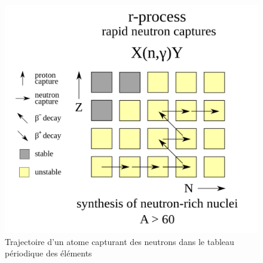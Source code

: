  \begin{figure}[H]
 	\centering
 	\includegraphics[scale=0.15]{images/processusr}
 	\caption{Trajectoire d'un atome capturant des neutrons dans le tableau périodique des éléments}
 \end{figure}\bigskip 
 
 
 



 
 
